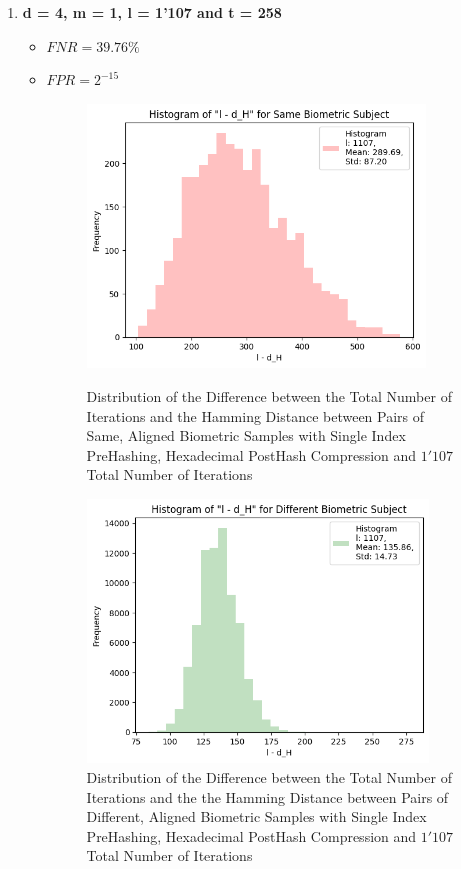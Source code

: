 \begin{enumerate}
    \item \textbf{d = 4, m = 1, l = 1'107 and t = 258}
        \begin{itemize}
            \item $FNR = 39.76\%$
            \item $FPR = 2^{-15}$

            \begin{figure}[H]
                \centering
                \begin{minipage}[b]{0.48\linewidth}
                    \centering
                    \includegraphics[width=\linewidth,height=7cm,keepaspectratio]{latex-img/l-dHconfig1_same_compression.png}
                    \caption{Distribution of the Difference between the Total Number of Iterations and the Hamming Distance between Pairs of Same, Aligned Biometric Samples with Single Index PreHashing, Hexadecimal PostHash Compression and $1'107$ Total Number of Iterations}
                    \label{l-dHconfig1a_same}
                \end{minipage}
                \hfill
                \begin{minipage}[b]{0.48\linewidth}
                    \centering
                    \includegraphics[width=\linewidth,height=7cm,keepaspectratio]{latex-img/l-dHconfig1_diff_compression.png}
                    \caption{Distribution of the Difference between the Total Number of Iterations and the the Hamming Distance between Pairs of Different, Aligned Biometric Samples with Single Index PreHashing, Hexadecimal PostHash Compression and $1'107$ Total Number of Iterations}
                    \label{l-dHconfig1a_diff}
                \end{minipage}
            \end{figure}
            

\end{itemize}
\end{enumerate}

